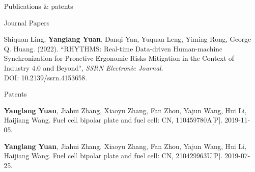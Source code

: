 \documentclass{resume} %
\begin{document}
\begin{rSection}{Publications \& patents}

    \begin{rSubsection}{Journal Papers}{}{}{}

        \item Shiquan Ling,{ \textbf{Yanglang Yuan}, Danqi Yan, Yuquan Leng, Yiming Rong, George Q. Huang. (2022). “RHYTHMS: Real-time Data-driven Human-machine Synchronization for Proactive Ergonomic Risks Mitigation in the Context of Industry 4.0 and Beyond", \textit{SSRN Electronic Journal}}.  \\DOI: 10.2139/ssrn.4153658.  \\
        \vspace{-10pt}
    \end{rSubsection}




       \begin{rSubsection}{Patents}{}{}{}
       \item { \textbf{Yanglang Yuan}, Jiahui Zhang, Xiaoyu Zhang, Fan Zhou, Yajun Wang, Hui Li, Haijiang Wang. Fuel cell bipolar plate and fuel cell: CN, 110459780A[P]. 2019-11-05.}
       \vspace{2pt}
       
       \item { \textbf{Yanglang Yuan}, Jiahui Zhang, Xiaoyu Zhang, Fan Zhou, Yajun Wang, Hui Li, Haijiang Wang. Fuel cell bipolar plate and fuel cell: CN, 210429963U[P]. 2019-07-25.}
       
       
       \end{rSubsection} 
    
            
\end{rSection}
\end{document}
